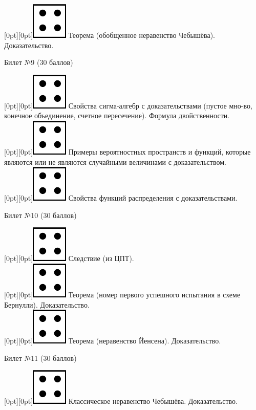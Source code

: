 \documentclass[preview]{standalone}
\begin{document}
\raisebox{-1pt}[0pt][0pt]{\includegraphics[width=0.02\linewidth]{4.png}} Теорема (обобщенное неравенство Чебышёва). Доказательство. \\
\begin{center} {\Large Билет №9 (30 баллов)} \end{center}
\raisebox{-1pt}[0pt][0pt]{\includegraphics[width=0.02\linewidth]{4.png}} Свойства сигма-алгебр с доказательствами (пустое мно-во, конечное объединение, счетное пересечение). Формула двойственности. \\
\raisebox{-1pt}[0pt][0pt]{\includegraphics[width=0.02\linewidth]{4.png}} Примеры вероятностных пространств и функций, которые являются или не являются случайными величинами с доказательством. \\
\raisebox{-1pt}[0pt][0pt]{\includegraphics[width=0.02\linewidth]{4.png}} Свойства функций распределения с доказательствами. \\
\begin{center} {\Large Билет №10 (30 баллов)} \end{center}
\raisebox{-1pt}[0pt][0pt]{\includegraphics[width=0.02\linewidth]{4.png}} Следствие (из ЦПТ). \\
\raisebox{-1pt}[0pt][0pt]{\includegraphics[width=0.02\linewidth]{4.png}} Теорема (номер первого успешного испытания в схеме Бернулли). Доказательство. \\
\raisebox{-1pt}[0pt][0pt]{\includegraphics[width=0.02\linewidth]{4.png}} Теорема (неравенство Йенсена). Доказательство. \\
\begin{center} {\Large Билет №11 (30 баллов)} \end{center}
\raisebox{-1pt}[0pt][0pt]{\includegraphics[width=0.02\linewidth]{4.png}} Классическое неравенство Чебышёва. Доказательство. \\
\end{document}
